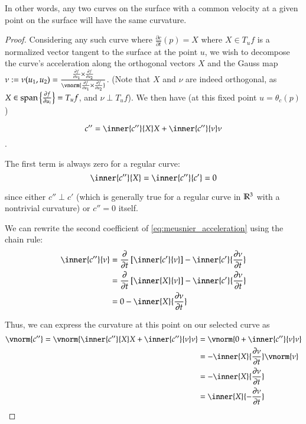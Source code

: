 	In other words, any two curves on the surface with a common velocity at a given point on the surface will have the same curvature.
	\begin{proof}
	Considering any such curve where $\frac{\partial c}{\partial t}(p) = X$ where $X \in T_u f$ is a normalized vector tangent to the surface at the point $u$,
	we wish to decompose the curve's acceleration along the  orthogonal vectors $X$ and
	the Gauss map $\nu := \nu(u_1, u_2) =
		\frac{\frac{\partial f}{\partial u_1} \times \frac{\partial f}{\partial u_2}}
		{\vnorm{\frac{\partial f}{\partial u_1} \times \frac{\partial f}{\partial u_2}}}$.
		(Note that $X$ and $\nu$ are indeed orthogonal,
		as $ X \in \mathrm{span}\left\{\frac{\partial f}{\partial u_i}\right\} = T_u f$, and
		$\nu \perp T_u f$).
	 We then have (at this fixed point $u=\theta_c(p)$)
		
		\begin{equation} \label{eq:meusnier_acceleration}
			c'' = \inner{c''}{X} X + \inner{c''}{\nu}\nu
			\end{equation}. 
	
	The first term is always zero for a regular curve:
	\[ \inner{c''}{X} = \inner{c''}{c'} = 0 \]
	
	since either $c'' \perp c'$ (which is generally true for a regular curve in $\mathbb{R}^3$ with a nontrivial curvature) or $c'' = 0$ itself.  
	
	We can rewrite the second coefficient of \cref{eq:meusnier_acceleration} using the chain rule: %
	\begin{align}
		\inner{c''}{\nu} &=
		\frac{\partial}{\partial t}\left[ \inner{c'}{\nu} \right]
			- \inner{c'}{\frac{\partial \nu}{\partial t}} \\
			&= \frac{\partial}{\partial t}\left[ \inner{X}{\nu} \right]
			- \inner{c'}{\frac{\partial \nu}{\partial t}} \\
			&= 0 - \inner{X}{\frac{\partial \nu}{\partial t}}
			\end{align}
	
	Thus, we can express the curvature at this point on our selected curve as
	\begin{align}
	\vnorm{c''} = \vnorm{\inner{c''}{X} X + \inner{c''}{\nu}\nu}
	&= \vnorm{0 + \inner{c''}{\nu}\nu} \\
	&= - \inner{X}{\frac{\partial \nu}{\partial t}}\vnorm{\nu} \\
	&= - \inner{X}{\frac{\partial \nu}{\partial t}} \\
	&=  \inner{X}{-\frac{\partial \nu}{\partial t}}
	\end{align}
	

\end{proof}
